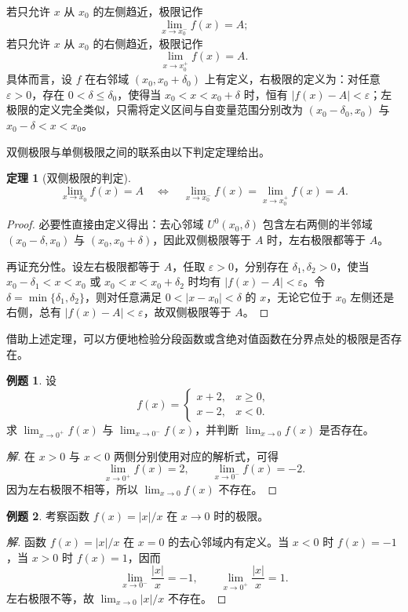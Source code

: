 \documentclass[UTF8,fontset=fandol,a4paper,12pt]{ctexart}
\newcommand{\U}{U}
\theoremstyle{definition}
\newtheorem*{criterion}{定理}
\newtheorem*{example}{例题}
\begin{document}
若只允许 $x$ 从 $x_0$ 的左侧趋近，极限记作
\[
 \lim_{x\to x_0^-}f(x)=A;
\]
若只允许 $x$ 从 $x_0$ 的右侧趋近，极限记作
\[
 \lim_{x\to x_0^+}f(x)=A.
\]
具体而言，设 $f$ 在右邻域 $(x_0,x_0+\delta_0)$ 上有定义，右极限的定义为：对任意 $\varepsilon>0$，存在 $0<\delta\le\delta_0$，使得当 $x_0<x<x_0+\delta$ 时，恒有 $|f(x)-A|<\varepsilon$；左极限的定义完全类似，只需将定义区间与自变量范围分别改为 $(x_0-\delta_0,x_0)$ 与 $x_0-\delta<x<x_0$。

双侧极限与单侧极限之间的联系由以下判定定理给出。

\begin{criterion}[双侧极限的判定]
\[
 \lim_{x\to x_0}f(x)=A
 \quad\Longleftrightarrow\quad
 \lim_{x\to x_0^-}f(x)=\lim_{x\to x_0^+}f(x)=A.
\]
\end{criterion}
\begin{proof}
必要性直接由定义得出：去心邻域 $\U^0(x_0,\delta)$ 包含左右两侧的半邻域 $(x_0-\delta,x_0)$ 与 $(x_0,x_0+\delta)$，因此双侧极限等于 $A$ 时，左右极限都等于 $A$。

再证充分性。设左右极限都等于 $A$，任取 $\varepsilon>0$，分别存在 $\delta_1,\delta_2>0$，使当 $x_0-\delta_1<x<x_0$ 或 $x_0<x<x_0+\delta_2$ 时均有 $|f(x)-A|<\varepsilon$。令 $\delta=\min\{\delta_1,\delta_2\}$，则对任意满足 $0<|x-x_0|<\delta$ 的 $x$，无论它位于 $x_0$ 左侧还是右侧，总有 $|f(x)-A|<\varepsilon$，故双侧极限等于 $A$。
\end{proof}

借助上述定理，可以方便地检验分段函数或含绝对值函数在分界点处的极限是否存在。

\begin{example}
设
\[
 f(x)=\begin{cases}x+2,&x\ge0,\\x-2,&x<0.\end{cases}
\]
求 $\lim_{x\to0^+}f(x)$ 与 $\lim_{x\to0^-}f(x)$，并判断 $\lim_{x\to0}f(x)$ 是否存在。
\end{example}
\begin{proof}[解]
在 $x>0$ 与 $x<0$ 两侧分别使用对应的解析式，可得
\[
 \lim_{x\to0^+}f(x)=2,\qquad \lim_{x\to0^-}f(x)=-2.
\]
因为左右极限不相等，所以 $\lim_{x\to0}f(x)$ 不存在。
\end{proof}

\begin{example}
考察函数 $f(x)=|x|/x$ 在 $x\to0$ 时的极限。
\end{example}
\begin{proof}[解]
函数 $f(x)=|x|/x$ 在 $x=0$ 的去心邻域内有定义。当 $x<0$ 时 $f(x)=-1$，当 $x>0$ 时 $f(x)=1$，因而
\[
 \lim_{x\to0^-}\frac{|x|}{x}=-1,\qquad
 \lim_{x\to0^+}\frac{|x|}{x}=1.
\]
左右极限不等，故 $\lim_{x\to0}|x|/x$ 不存在。
\end{proof}
\end{document}
